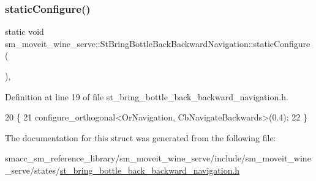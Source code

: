 \subsubsection{\texorpdfstring{static\+Configure()}{staticConfigure()}}
{\footnotesize\ttfamily static void sm\+\_\+moveit\+\_\+wine\+\_\+serve\+::\+St\+Bring\+Bottle\+Back\+Backward\+Navigation\+::static\+Configure (\begin{DoxyParamCaption}{ }\end{DoxyParamCaption})\hspace{0.3cm}{\ttfamily [inline]}, {\ttfamily [static]}}



Definition at line 19 of file st\+\_\+bring\+\_\+bottle\+\_\+back\+\_\+backward\+\_\+navigation.\+h.


\begin{DoxyCode}
20         \{
21             configure\_orthogonal<OrNavigation, CbNavigateBackwards>(0.4);
22         \}
\end{DoxyCode}


The documentation for this struct was generated from the following file\+:\begin{DoxyCompactItemize}
\item 
smacc\+\_\+sm\+\_\+reference\+\_\+library/sm\+\_\+moveit\+\_\+wine\+\_\+serve/include/sm\+\_\+moveit\+\_\+wine\+\_\+serve/states/\hyperlink{st__bring__bottle__back__backward__navigation_8h}{st\+\_\+bring\+\_\+bottle\+\_\+back\+\_\+backward\+\_\+navigation.\+h}\end{DoxyCompactItemize}
